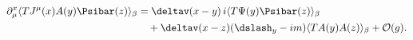 \begin{equation}
\begin{split}
\label{eq:wt_2}
\partial^x_\mu\langle T J^\mu(x)A(y)\Psibar(z)\rangle_\beta
&=\deltav(x-y)\,i\langle T \Psi(y)\Psibar(z)\rangle_\beta\\
&\quad +\deltav(x-z)
(\dslash_y-im)\langle T A(y)A(z)\rangle_\beta+\mathcal{O}(g).
\end{split}
\end{equation}

